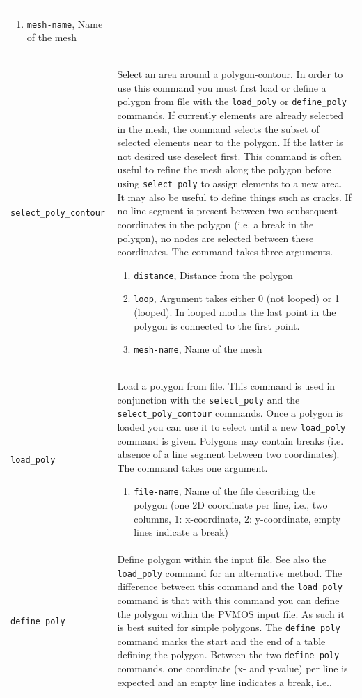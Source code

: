 \documentclass[noshowpacs,preprintnumbers,amsmath,amssymb, letter]{revtex4}
\begin{document}
\begin{longtable}{p{}p{}}
\begin{enumerate}
\item \texttt{mesh-name}, Name of the mesh
\end{enumerate}\\
\texttt{select\_poly\_contour}	& Select an area around a polygon-contour. In order to use this command you must first load or define a polygon from file with the \texttt{load\_poly} or \texttt{define\_poly} commands. If currently elements are already selected in the mesh, the command selects the subset of selected elements near to the polygon. If the latter is not desired use deselect first. This command is often useful to refine the mesh along the polygon before using \texttt{select\_poly} to assign elements to a new area. It may also be useful to define things such as cracks. If no line segment is present between two seubsequent coordinates in the polygon (i.e. a break in the polygon), no nodes are selected between these coordinates. The command takes three arguments.
\begin{enumerate}
\item \texttt{distance}, Distance from the polygon
\item \texttt{loop}, Argument takes either 0 (not looped) or 1 (looped). In looped modus the last point in the polygon is connected to the first point.
\item \texttt{mesh-name}, Name of the mesh
\end{enumerate}\\
\texttt{load\_poly}	& Load a polygon from file. This command is used in conjunction with the \texttt{select\_poly} and the \texttt{select\_poly\_contour} commands. Once a polygon is loaded you can use it to select until a new \texttt{load\_poly} command is given. Polygons may contain breaks (i.e. absence of a line segment between two coordinates). The command takes one argument.
\begin{enumerate}
\item \texttt{file-name}, Name of the file describing the polygon (one 2D coordinate per line, i.e., two columns, 1: x-coordinate, 2: y-coordinate, empty lines indicate a break)
\end{enumerate}\\
\texttt{define\_poly}	& Define polygon within the input file. See also the \texttt{load\_poly} command for an alternative method. The difference between this command and the \texttt{load\_poly} command is that with this command you can define the polygon within the PVMOS input file. As such it is best suited for simple polygons. The \texttt{define\_poly} command marks the start and the end of a table defining the polygon. Between the two \texttt{define\_poly} commands, one coordinate (x- and y-value) per line is expected and an empty line indicates a break, i.e.,\\

\end{longtable}
\end{document}
